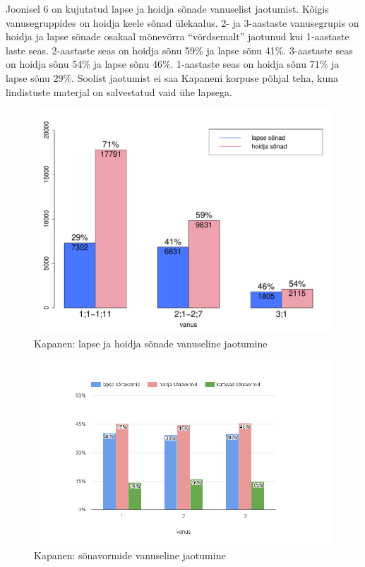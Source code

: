 \documentclass[12pt]{article}
\begin{document}
Joonisel 6 on kujutatud lapse ja hoidja sõnade vanuselist jaotumist. Kõigis vanusegruppides on hoidja keele sõnad ülekaalus. 2- ja 3-aastaste vanusegrupis on hoidja ja lapse sõnade osakaal mõnevõrra ``võrdsemalt'' jaotunud kui 1-aastaste laste seas. 2-aastaste seas on hoidja sõnu 59\% ja lapse sõnu 41\%. 3-aastaste seas on hoidja sõnu 54\% ja lapse sõnu 46\%. 1-aastaste seas on hoidja sõnu 71\% ja lapse sõnu 29\%. Soolist jaotumist ei saa Kapaneni korpuse põhjal teha, kuna lindistuste materjal on salvestatud vaid ühe lapsega.

\begin{figure}[H]
    \centering
    \includegraphics[width=\textwidth]{kapanen_vanus_sonad}
    \caption{Kapanen: lapse ja hoidja sõnade vanuseline jaotumine}
\end{figure}



\begin{figure}[H]
    \centering
    \includegraphics[width=\textwidth]{kapanen_vanus_vormid}
    \caption{Kapanen: sõnavormide vanuseline jaotumine}
\end{figure}
\end{document}
